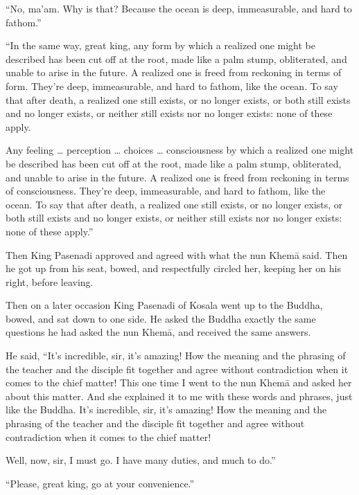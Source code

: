 \documentclass[12pt,openany]{book}%
\begin{document}
“No, ma’am. Why is that? Because the ocean is deep, immeasurable, and hard to fathom.” 

“In the same way, great king, any form by which a realized one might be described has been cut off at the root, made like a palm stump, obliterated, and unable to arise in the future. A realized one is freed from reckoning in terms of form. They’re deep, immeasurable, and hard to fathom, like the ocean. To say that after death, a realized one still exists, or no longer exists, or both still exists and no longer exists, or neither still exists nor no longer exists: none of these apply. 

Any feeling … perception … choices … consciousness by which a realized one might be described has been cut off at the root, made like a palm stump, obliterated, and unable to arise in the future. A realized one is freed from reckoning in terms of consciousness. They’re deep, immeasurable, and hard to fathom, like the ocean. To say that after death, a realized one still exists, or no longer exists, or both still exists and no longer exists, or neither still exists nor no longer exists: none of these apply.” 

Then King Pasenadi approved and agreed with what the nun \textsanskrit{Khemā} said. Then he got up from his seat, bowed, and respectfully circled her, keeping her on his right, before leaving. 

Then on a later occasion King Pasenadi of Kosala went up to the Buddha, bowed, and sat down to one side. He asked the Buddha exactly the same questions he had asked the nun \textsanskrit{Khemā}, and received the same answers. 

He said, “It’s incredible, sir, it’s amazing! How the meaning and the phrasing of the teacher and the disciple fit together and agree without contradiction when it comes to the chief matter! This one time I went to the nun \textsanskrit{Khemā} and asked her about this matter. And she explained it to me with these words and phrases, just like the Buddha. It’s incredible, sir, it’s amazing! How the meaning and the phrasing of the teacher and the disciple fit together and agree without contradiction when it comes to the chief matter! 

Well, now, sir, I must go. I have many duties, and much to do.” 

“Please, great king, go at your convenience.” 
\end{document}
